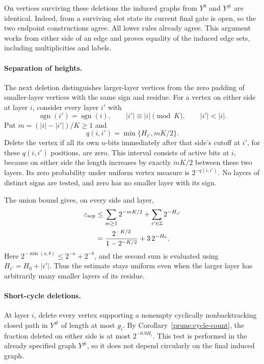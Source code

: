 On vertices surviving these deletions the induced graphs from
\(Y^0\) and \(Y^\#\) are identical.  Indeed, from a surviving
slot state its current final gate is open, so the two endpoint
constructions agree.  All lower rules already agree.  This argument
works from either side of an edge and proves equality of the induced
edge sets, including multiplicities and labels.

\paragraph{Separation of heights.}
The next deletion distinguishes larger-layer vertices from the zero
padding of smaller-layer vertices with the same sign and residue.
For a vertex on either side at layer \(i\), consider every layer
\(i'\) with
\[
 \operatorname{sgn}(i')=\operatorname{sgn}(i),\qquad
 |i'|\equiv|i|\pmod K,\qquad |i'|<|i|.
\]
Put \(m=(|i|-|i'|)/K\geq1\) and
\begin{equation}
 q(i,i')=\min\{H_{i'},mK/2\}.
 \label{prune:zero-window}
\end{equation}
Delete the vertex if all its own \(u\)-bits immediately after that
side's cutoff at \(i'\), for these \(q(i,i')\) positions, are zero.
This interval consists of active bits at \(i\), because on either
side the length increases by exactly \(mK/2\) between these two
layers.  Its zero probability under uniform vertex measure is
\(2^{-q(i,i')}\).  No layers of distinct signs are tested, and
zero has no smaller layer with its sign.

The union bound gives, on every side and layer,
\begin{equation}
\begin{split}
 \varepsilon_{\rm sep}
 &\leq\sum_{m\geq1}2^{-mK/2}+\sum_{i'\in\mathbb Z}2^{-H_{i'}}\\
 &=\frac{2^{-K/2}}{1-2^{-K/2}}+3\,2^{-H_0}.
\end{split}
\label{prune:separation-budget}
\end{equation}
Here \(2^{-\min(a,b)}\leq2^{-a}+2^{-b}\), and the second sum
is evaluated using \(H_{i'}=H_0+|i'|\).  Thus the estimate stays
uniform even when the larger layer has arbitrarily many smaller
layers of its residue.

\paragraph{Short-cycle deletions.}
At layer \(i\), delete every vertex supporting a nonempty cyclically
nonbacktracking closed path in \(Y^\#\) of length at most \(g_i\).
By Corollary~\ref{prune:cycle-count}, the fraction deleted on either
side is at most \(2^{-0.9H_i}\).  This test is performed in the
already specified graph \(Y^\#\), so it does not depend circularly
on the final induced graph.

